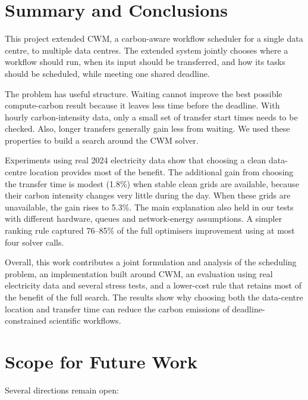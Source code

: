 \documentclass[12pt,a4paper,oneside,openany]{report}
\begin{document}
\chapter{Summary and Conclusions}\label{ch:8}

This project extended CWM, a carbon-aware workflow scheduler for a
single data centre, to multiple data centres. The extended system
jointly chooses where a workflow should run, when its input should be
transferred, and how its tasks should be scheduled, while meeting one
shared deadline.

The problem has useful structure. Waiting cannot improve the best
possible compute-carbon result because it leaves less time before the
deadline. With hourly carbon-intensity data, only a small set of
transfer start times needs to be checked. Also, longer transfers
generally gain less from waiting. We used these properties to build a
search around the CWM solver.

Experiments using real 2024 electricity data show that choosing a clean
data-centre location provides most of the benefit. The additional gain
from choosing the transfer time is modest (1.8\%) when stable clean
grids are available, because their carbon intensity changes very little
during the day. When these grids are unavailable, the gain rises to
5.3\%. The main explanation also held in our tests with different
hardware, queues and network-energy assumptions. A simpler ranking rule
captured 76--85\% of the full optimiser\textquotesingle s improvement
using at most four solver calls.

Overall, this work contributes a joint formulation and analysis of the
scheduling problem, an implementation built around CWM, an evaluation using real electricity data and several stress
tests, and a lower-cost rule that retains most of the benefit of the
full search. The results show why choosing both the data-centre location
and transfer time can reduce the carbon emissions of
deadline-constrained scientific workflows.

\chapter{Scope for Future Work}\label{ch:9}

Several directions remain open:
\end{document}
